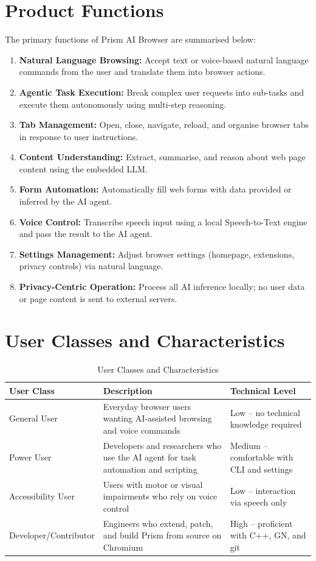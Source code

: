 \section{Product Functions}
The primary functions of Prism AI Browser are summarised below:

\begin{enumerate}[leftmargin=*]
    \item \textbf{Natural Language Browsing:} Accept text or voice-based natural language commands from the user and translate them into browser actions.
    \item \textbf{Agentic Task Execution:} Break complex user requests into sub-tasks and execute them autonomously using multi-step reasoning.
    \item \textbf{Tab Management:} Open, close, navigate, reload, and organise browser tabs in response to user instructions.
    \item \textbf{Content Understanding:} Extract, summarise, and reason about web page content using the embedded LLM.
    \item \textbf{Form Automation:} Automatically fill web forms with data provided or inferred by the AI agent.
    \item \textbf{Voice Control:} Transcribe speech input using a local Speech-to-Text engine and pass the result to the AI agent.
    \item \textbf{Settings Management:} Adjust browser settings (homepage, extensions, privacy controls) via natural language.
    \item \textbf{Privacy-Centric Operation:} Process all AI inference locally; no user data or page content is sent to external servers.
\end{enumerate}

\section{User Classes and Characteristics}
\begin{longtable}{|p{3.5cm}|p{5.5cm}|p{4.5cm}|}
\caption{User Classes and Characteristics} \\
\hline
\textbf{User Class} & \textbf{Description} & \textbf{Technical Level} \\ \hline
\endhead
General User      & Everyday browser users wanting AI-assisted browsing and voice commands & Low -- no technical knowledge required \\ \hline
Power User        & Developers and researchers who use the AI agent for task automation and scripting & Medium -- comfortable with CLI and settings \\ \hline
Accessibility User& Users with motor or visual impairments who rely on voice control & Low -- interaction via speech only \\ \hline
Developer/Contributor & Engineers who extend, patch, and build Prism from source on Chromium & High -- proficient with C++, GN, and git \\ \hline
\end{longtable}


